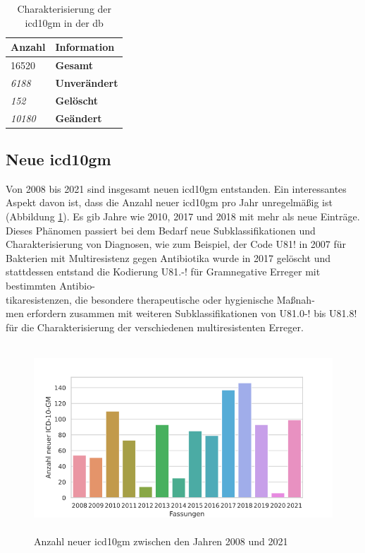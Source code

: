  \begin{table}[ht]
 	\centering
 	\small
 	\caption[\acs{icd10gm} in der \acs{db}]{Charakterisierung der \acs{icd10gm} in der \ac{db}}
 	\label{tab:icddb}
 	\begin{tabular}{|l|l|}
 		\hline
 		\rowcolor{lightgray}	Anzahl & Information \\ \hline 
 		16520 & \textbf{Gesamt} \\ \hline
 		\hline
 		\textit{6188} & \textbf{Unverändert} \\ \hline
 		\textit{152} & \textbf{Gelöscht} \\ \hline
 		\textit{10180} & \textbf{Geändert} \\ \hline
 	\end{tabular}
 \end{table}

\newpage

\subsection{Neue \acs{icd10gm}}

Von 2008 bis 2021 sind insgesamt {} neuen \ac{icd10gm} entstanden. Ein interessantes Aspekt davon ist, dass die Anzahl neuer \ac{icd10gm} pro Jahr unregelmäßig ist (Abbildung \ref{fig:newicdyear}). Es gib Jahre wie 2010, 2017 und 2018 mit mehr als {} neue Einträge. Dieses Phänomen passiert bei dem Bedarf neue Subklassifikationen und Charakterisierung von Diagnosen, wie zum Beispiel, der Code {\ttfamily U81!} in 2007 für {\ttfamily Bakterien mit Multiresistenz gegen Antibiotika} wurde in 2017 gelöscht und stattdessen entstand die Kodierung {\ttfamily U81.-!} für {\ttfamily Gramnegative Erreger mit bestimmten Antibio-\\tikaresistenzen, die besondere therapeutische oder hygienische Maßnah-\\men erfordern} zusammen mit {} weiteren Subklassifikationen von {\ttfamily U81.0-!} bis {\ttfamily U81.8!} für die Charakterisierung der verschiedenen multiresistenten Erreger.

\begin{figure}[ht]
	\centering
	\includegraphics[height=7cm]{figures/newicdyear}
	\caption[Neue \acs{icd10gm} pro Jahr]{Anzahl neuer \acs{icd10gm} zwischen den Jahren 2008 und 2021}
	\label{fig:newicdyear}
\end{figure} 

